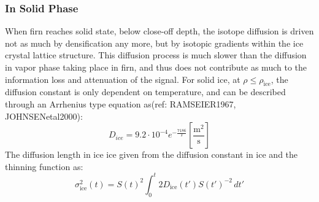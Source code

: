\documentclass[../../CompleteThesis/Complete_1stDraft.tex]{subfiles}
\begin{document}
\subsubsection{In Solid Phase}
\label{Subsubsec:Ice_DiffusionAndDensification_Diffusion_Ice}
When firn reaches solid state, below close-off depth, the isotope diffusion is driven not as much by densification any more, but by isotopic gradients within the ice crystal lattice structure. This diffusion process is much slower than the diffusion in vapor phase taking place in firn, and thus does not contribute as much to the information loss and attenuation of the signal. For solid ice, at $\rho \leq \rho_{\text{ice}}$, the diffusion constant is only dependent on temperature, and can be described through an Arrhenius type equation as(ref: RAMSEIER1967, JOHNSENetal2000):
\begin{equation}
	D_{ice} = 9.2 \cdot 10^{-4} e^{-\frac{7186}{T}} 	\left[\frac{\text{m}^2}{\text{s}}\right]
	\label{Eq:Ice_Diff_const}
\end{equation}
The diffusion length in ice ice given from the diffusion constant in ice and the thinning function as:
\begin{equation}
	\sigma^2_{\text{ice}}(t) = S(t)^2 \int_{0}^{t}2 D_{\text{ice}}(t') S(t')^{-2} \, dt'
	\label{Eq:Diff_Len_Ice}
\end{equation}
\end{document}
